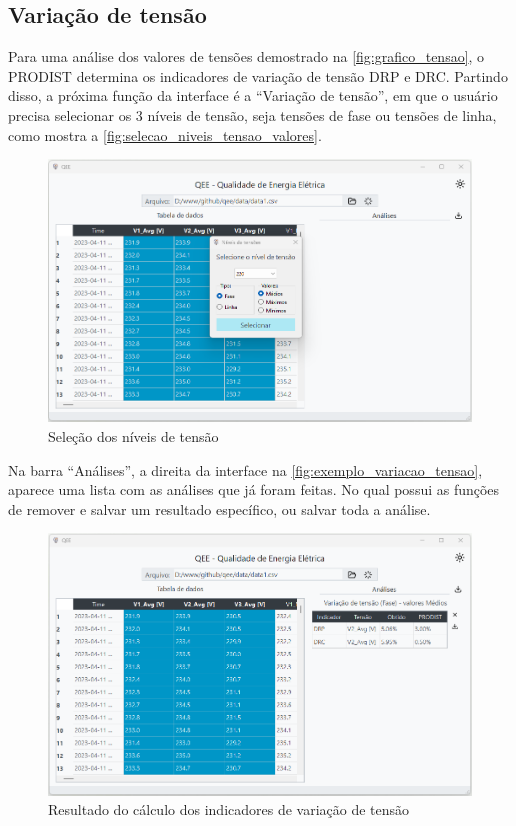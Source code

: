 \subsection{Variação de tensão}

Para uma análise dos valores de tensões demostrado na \autoref{fig:grafico_tensao}, o PRODIST determina os indicadores de variação de tensão DRP e DRC. Partindo disso, a próxima função da interface é a “Variação de tensão”, em que o usuário precisa selecionar os 3 níveis de tensão, seja tensões de fase ou tensões de linha, como mostra a \autoref{fig:selecao_niveis_tensao_valores}.

\begin{figure}[H]
  \centering
  \caption{Seleção dos níveis de tensão}
  \label{fig:selecao_niveis_tensao_valores}
  \includegraphics[width=15cm]{illustrations/figures/selecao_niveis_tensao_valores.png}
\end{figure}

Na barra “Análises”, a direita da interface na \autoref{fig:exemplo_variacao_tensao}, aparece uma lista com as análises que já foram feitas. No qual possui as funções de remover e salvar um resultado específico, ou salvar toda a análise.

\begin{figure}[H]
  \centering
  \caption{Resultado do cálculo dos indicadores de variação de tensão}
  \label{fig:exemplo_variacao_tensao}
  \includegraphics[width=15cm]{illustrations/figures/exemplo_variacao_tensao.png}
\end{figure}

